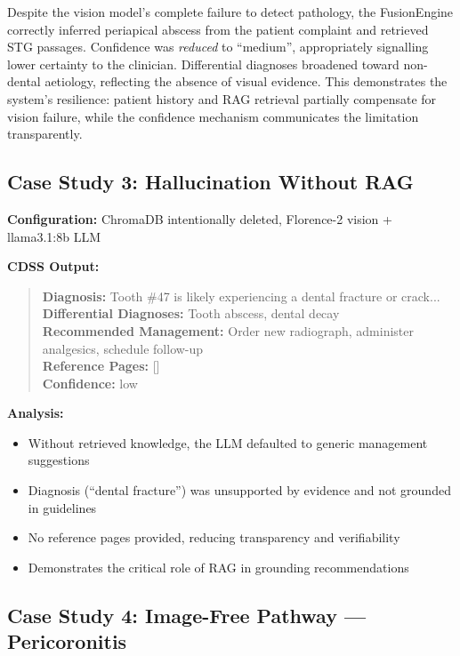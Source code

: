 \documentclass[12pt,a4paper]{report}
\begin{document}
	Despite the vision model's complete failure to detect pathology, the FusionEngine
	correctly inferred periapical abscess from the patient complaint and retrieved
	STG passages. Confidence was \emph{reduced} to ``medium'', appropriately
	signalling lower certainty to the clinician. Differential diagnoses broadened
	toward non-dental aetiology, reflecting the absence of visual evidence. This
	demonstrates the system's resilience: patient history and RAG retrieval
	partially compensate for vision failure, while the confidence mechanism
	communicates the limitation transparently.
	
	
	\subsection{Case Study 3: Hallucination Without RAG}
	
	\textbf{Configuration:} ChromaDB intentionally deleted, Florence-2 vision + llama3.1:8b LLM
	
	\textbf{CDSS Output:}
	\begin{quote}
		\textbf{Diagnosis:} Tooth \#47 is likely experiencing a dental fracture or crack... \\
		\textbf{Differential Diagnoses:} Tooth abscess, dental decay \\
		\textbf{Recommended Management:} Order new radiograph, administer analgesics, schedule follow-up \\
		\textbf{Reference Pages:} []\\
		\textbf{Confidence:} low
	\end{quote}
	
	\textbf{Analysis:}
	\begin{itemize}
		\item Without retrieved knowledge, the LLM defaulted to generic management suggestions
		\item Diagnosis (``dental fracture'') was unsupported by evidence and not grounded in guidelines
		\item No reference pages provided, reducing transparency and verifiability
		\item Demonstrates the critical role of RAG in grounding recommendations
	\end{itemize}
	
	
	\subsection{Case Study 4: Image-Free Pathway --- Pericoronitis}
	\label{subsec:case3}
	
\end{document}
